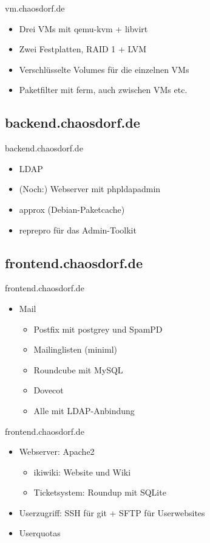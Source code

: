 \documentclass{beamer}
\begin{document}
\begin{frame}{vm.chaosdorf.de}
	\begin{itemize}
		\item Drei VMs mit qemu-kvm + libvirt
		\item Zwei Festplatten, RAID 1 + LVM
		\item Verschlüsselte Volumes für die einzelnen VMs
		\item Paketfilter mit ferm, auch zwischen VMs etc.
	\end{itemize}
\end{frame}

\subsection{backend.chaosdorf.de}
\begin{frame}{backend.chaosdorf.de}
	\begin{itemize}
		\item LDAP
		\item (Noch:) Webserver mit phpldapadmin
		\item approx (Debian-Paketcache)
		\item reprepro für das Admin-Toolkit
	\end{itemize}
\end{frame}

\subsection{frontend.chaosdorf.de}
\begin{frame}{frontend.chaosdorf.de}
	\begin{itemize}
		\item Mail
		\begin{itemize}
			\item Postfix mit postgrey und SpamPD
			\item Mailinglisten (miniml)
			\item Roundcube mit MySQL
			\item Dovecot
			\item Alle mit LDAP-Anbindung
		\end{itemize}
	\end{itemize}
\end{frame}

\begin{frame}{frontend.chaosdorf.de}
	\begin{itemize}
		\item Webserver: Apache2
		\begin{itemize}
			\item ikiwiki: Website und Wiki
			\item Ticketsystem: Roundup mit SQLite
		\end{itemize}
		\item Userzugriff: SSH für git + SFTP für Userwebsites
		\item Userquotas
	\end{itemize}
\end{frame}
\end{document}
